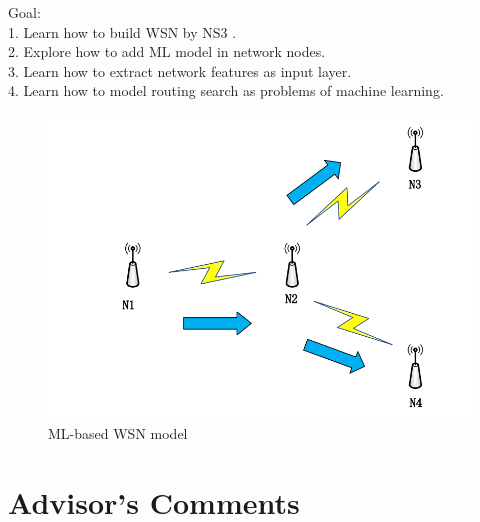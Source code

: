 \documentclass[11pt]{report}
\begin{document}
	\noindent Goal:\\
	1. Learn how to build WSN by NS3 \cite{NS3}.\\
	2. Explore how to add ML model in network nodes.\\
	3. Learn how to extract network features as input layer.\\
	4. Learn how to model routing search as problems of machine learning.\\
	
	\begin{figure}[h!]
		\centering
		\includegraphics[width=0.8\linewidth]{wsn.png}
		\caption{ML-based WSN model}
		\label{3rdfig}
	\end{figure}

	
	\section{Advisor's Comments}
	
	
	
	
\end{document}
